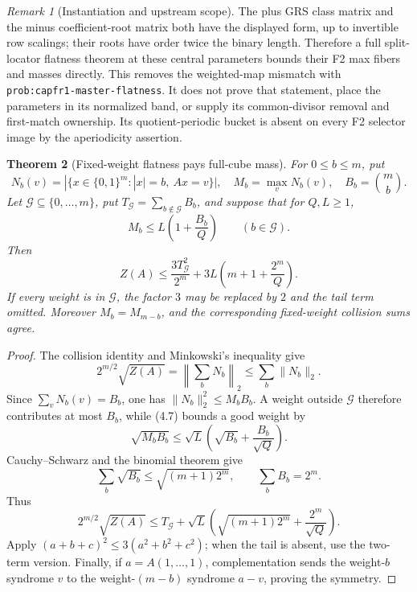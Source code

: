 \documentclass[11pt,a4paper]{amsart}
\newtheorem{theorem}{Theorem}[section]
\theoremstyle{remark}
\newtheorem{remark}[theorem]{Remark}
\begin{document}
\begin{remark}[Instantiation and upstream scope]
The plus GRS class matrix and the minus coefficient-root matrix both have
the displayed form, up to invertible row scalings; their roots have order
twice the binary length.  Therefore a full split-locator flatness theorem
at these central parameters bounds their F2 max fibers and masses directly.
This removes the weighted-map mismatch with
\texttt{prob:capfr1-master-flatness}.  It does not prove that statement,
place the parameters in its normalized band, or supply its common-divisor
removal and first-match ownership.  Its quotient-periodic bucket is absent
on every F2 selector image by the aperiodicity assertion.
\end{remark}

\begin{theorem}[Fixed-weight flatness pays full-cube mass]
\label{thm:fixed-weight-bridge}
For $0\le b\le m$, put
\[
 N_b(v)=|\{x\in\{0,1\}^m:|x|=b,\ Ax=v\}|,
 \quad M_b=\max_vN_b(v),
 \quad B_b=\binom mb.
\]
Let \(\mathcal G\subseteq\{0,\ldots,m\}\), put
\(T_{\mathcal G}=\sum_{b\notin\mathcal G}B_b\), and suppose that for
\(Q,L\ge1\),
\[
 M_b\le L\left(1+\frac{B_b}{Q}\right)
 \qquad(b\in\mathcal G).                            \tag{4.7}
\]
Then
\[
 Z(A)\le \frac{3T_{\mathcal G}^2}{2^m}
       +3L\left(m+1+\frac{2^m}{Q}\right).           \tag{4.8}
\]
If every weight is in \(\mathcal G\), the factor $3$ may be replaced by $2$
and the tail term omitted.  Moreover \(M_b=M_{m-b}\), and the corresponding
fixed-weight collision sums agree.
\end{theorem}

\begin{proof}
The collision identity and Minkowski's inequality give
\[
 2^{m/2}\sqrt{Z(A)}
 =\left\|\sum_bN_b\right\|_2
 \le\sum_b\|N_b\|_2.
\]
Since \(\sum_vN_b(v)=B_b\), one has
\(\|N_b\|_2^2\le M_bB_b\).  A weight outside \(\mathcal G\) therefore
contributes at most \(B_b\), while (4.7) bounds a good weight by
\[
 \sqrt{M_bB_b}
 \le\sqrt L\left(\sqrt{B_b}+\frac{B_b}{\sqrt Q}\right).
\]
Cauchy--Schwarz and the binomial theorem give
\[
 \sum_b\sqrt{B_b}\le\sqrt{(m+1)2^m},
 \qquad \sum_bB_b=2^m.
\]
Thus
\[
 2^{m/2}\sqrt{Z(A)}
 \le T_{\mathcal G}
 +\sqrt L\left(\sqrt{(m+1)2^m}+\frac{2^m}{\sqrt Q}\right).
\]
Apply \((a+b+c)^2\le3(a^2+b^2+c^2)\); when the tail is absent, use the
two-term version.  Finally, if \(a=A(1,\ldots,1)\), complementation sends
the weight-\(b\) syndrome \(v\) to the weight-\((m-b)\) syndrome \(a-v\),
proving the symmetry.
\end{proof}
\end{document}
